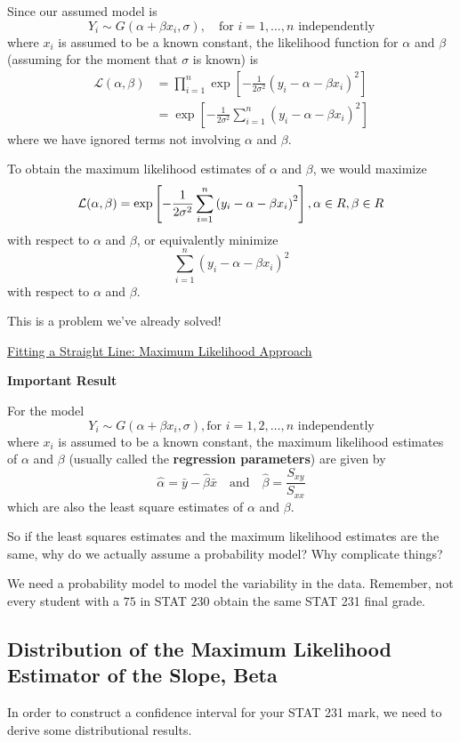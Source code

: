 \documentclass[oneside]{book}
\let\mathbb\relax
\begin{document}
Since our assumed model is
\[Y_{i} \sim G\left(\alpha+\beta x_{i}, \sigma\right), \quad \text{for } i=1, \ldots, n \text{ independently}\]
where $ x_i $ is assumed to be a known constant, the likelihood function for $ \alpha $
and $ \beta $ (assuming for the moment that $ \sigma $ is known) is
\[\begin{aligned}
        \mathcal{L}(\alpha, \beta)
         & =\prod_{i=1}^{n} \exp \left[-\frac{1}{2 \sigma^{2}}\left(y_{i}-\alpha-\beta x_{i}\right)^{2}\right] \\
         & =\exp \left[-\frac{1}{2 \sigma^{2}} \sum_{i=1}^{n}\left(y_{i}-\alpha-\beta x_{i}\right)^{2}\right]
    \end{aligned}
\]
where we have ignored terms not involving $ \alpha $ and $ \beta $.

To obtain the maximum likelihood estimates of $ \alpha $ and $ \beta $,
we would maximize
\[\mathcal{L}(\alpha, \beta)=\exp \left[-\frac{1}{2 \sigma^{2}} \sum_{i=1}^{n}\left(y_{i}-\alpha-\beta x_{i}\right)^{2}\right],
    \alpha \in \mathbb{R}, \beta \in \mathbb{R}\]
with respect to $ \alpha $ and $ \beta $, or equivalently minimize
\[\sum_{i=1}^{n}\left(y_{i}-\alpha-\beta x_{i}\right)^{2}\]
with respect to $ \alpha $ and $ \beta $.

This is a problem we've already solved!

\underline{Fitting a Straight Line: Maximum Likelihood Approach}

\textbf{Important Result}

For the model
\[Y_{i} \sim G\left(\alpha+\beta x_{i}, \sigma\right),
    \text{for } i=1,2, \ldots, n \text{ independently}\]
where $ x_i $ is assumed to be a known constant, the maximum likelihood estimates of $ \alpha $
and $ \beta $ (usually called the \textbf{regression parameters}) are given by
\[\hat{\alpha}=\bar{y}-\hat{\beta} \bar{x} \quad \text{and} \quad \hat{\beta}=\frac{S_{x y}}{S_{x x}}\]
which are also the least square estimates of $ \alpha $ and $ \beta $.

So if the least squares estimates and the maximum likelihood estimates are the same,
why do we actually assume a probability model? Why complicate things?

We need a probability model to model the variability in the data. Remember,
not every student with a $ 75 $ in STAT 230 obtain the same STAT 231 final grade.

\subsection{Distribution of the Maximum Likelihood Estimator of the Slope, Beta}
In order to construct a confidence interval for your STAT 231 mark, we need to derive
some distributional results.
\end{document}
